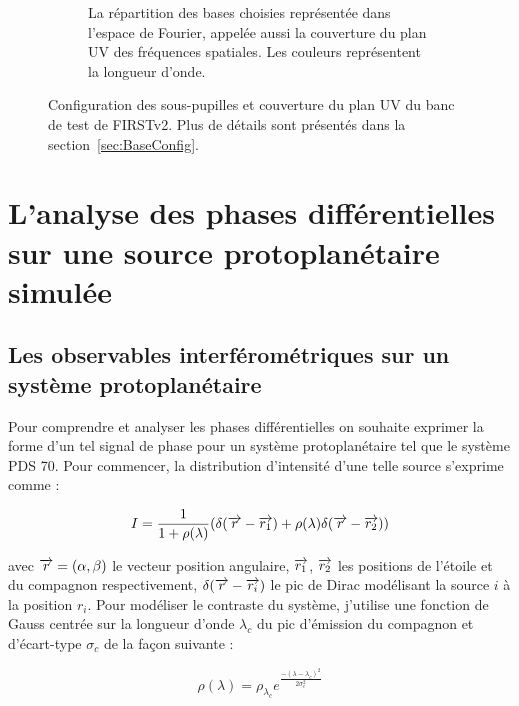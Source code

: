 \begin{figure}[ht!]
\begin{subfigure}{0.59\textwidth}
        \caption{La répartition des bases choisies représentée dans l'espace de Fourier, appelée aussi la couverture du plan UV des fréquences spatiales. Les couleurs représentent la longueur d'onde.}
        \label{fig:SegUVSimuleRappelB}
    \end{subfigure}
    \caption[Configuration des sous-pupilles et couverture du plan UV du banc de test de FIRSTv2.]{Configuration des sous-pupilles et couverture du plan UV du banc de test de FIRSTv2. Plus de détails sont présentés dans la section~\ref{sec:BaseConfig}.}
    \label{fig:SegUVSimuleRappel}
\end{figure}


\section{L'analyse des phases différentielles sur une source protoplanétaire simulée}
\label{sec:PhaseDiffAnalyse}

\subsection{Les observables interférométriques sur un système protoplanétaire}

Pour comprendre et analyser les phases différentielles on souhaite exprimer la forme d'un tel signal de phase pour un système protoplanétaire tel que le système PDS 70. Pour commencer, la distribution d'intensité d'une telle source s'exprime comme :

\begin{equation}
    I = \frac{1}{1 + \rho(\lambda)} (\delta(\overrightarrow{r} - \overrightarrow{r_1}) + \rho(\lambda) \delta(\overrightarrow{r} - \overrightarrow{r_2}))
\end{equation}

avec $\overrightarrow{r} = (\alpha, \beta)$ le vecteur position angulaire, $\overrightarrow{r_1}$, $\overrightarrow{r_2}$ les positions de l'étoile et du compagnon respectivement, $\delta(\overrightarrow{r} - \overrightarrow{r_i})$ le pic de Dirac modélisant la source $i$ à la position $r_i$. Pour modéliser le contraste du système, j'utilise une fonction de Gauss centrée sur la longueur d'onde $\lambda_c$ du pic d'émission du compagnon et d'écart-type $\sigma_c$ de la façon suivante : 

\begin{equation}
    \rho(\lambda) = \rho_{\lambda_c} e^{\frac{-(\lambda - \lambda_c)^2}{2 \sigma_{c}^2}}
\end{equation}

